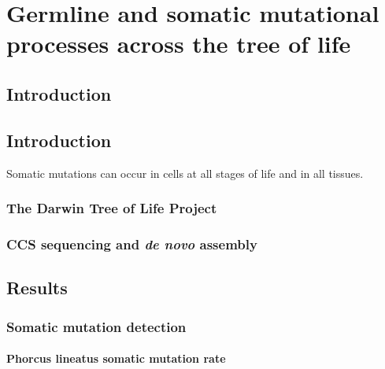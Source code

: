 \chapter{Germline and somatic mutational processes across the tree of life}

\ifpdf
    \graphicspath{{Chapter3/Figs/Raster/}{Chapter3/Figs/PDF/}{Chapter3/Figs/}}
\else
    \graphicspath{{Chapter3/Figs/Vector/}{Chapter3/Figs/}}
\fi


\section{Introduction}


\section{Introduction}

Somatic mutations can occur in cells at all stages of life and in all tissues. 

\subsection{The Darwin Tree of Life Project}

\subsection{CCS sequencing and \textit{de novo} assembly}

\section{Results}

\subsection{Somatic mutation detection}

\subsubsection{Phorcus lineatus somatic mutation rate}



